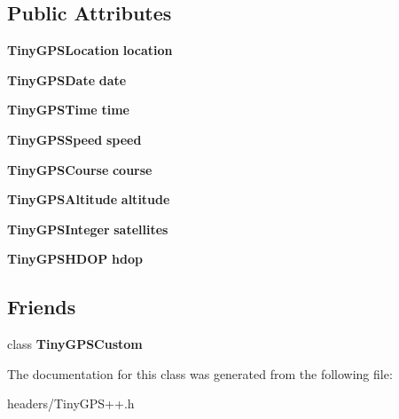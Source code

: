 \subsection*{Public Attributes}
\begin{DoxyCompactItemize}
\item 
{\bf Tiny\+G\+P\+S\+Location} {\bfseries location}\label{class_tiny_g_p_s_plus_a886255f412f8e01f84e5104d36315fb3}

\item 
{\bf Tiny\+G\+P\+S\+Date} {\bfseries date}\label{class_tiny_g_p_s_plus_a83a70812b432d7f51c7c735bfe7be0f0}

\item 
{\bf Tiny\+G\+P\+S\+Time} {\bfseries time}\label{class_tiny_g_p_s_plus_a377c975527fa24b45fb86356505eb134}

\item 
{\bf Tiny\+G\+P\+S\+Speed} {\bfseries speed}\label{class_tiny_g_p_s_plus_aa085c3e72a399a829dd92af52b373404}

\item 
{\bf Tiny\+G\+P\+S\+Course} {\bfseries course}\label{class_tiny_g_p_s_plus_ad7800d3decbe58e355f5229bba231868}

\item 
{\bf Tiny\+G\+P\+S\+Altitude} {\bfseries altitude}\label{class_tiny_g_p_s_plus_a0b3451a4ee75e5880ffd88c3038eacf8}

\item 
{\bf Tiny\+G\+P\+S\+Integer} {\bfseries satellites}\label{class_tiny_g_p_s_plus_a5fb47066d1d03f4bb5853529053aab48}

\item 
{\bf Tiny\+G\+P\+S\+H\+D\+OP} {\bfseries hdop}\label{class_tiny_g_p_s_plus_a0bb6a7eb2d0261095911d71c8c067546}

\end{DoxyCompactItemize}
\subsection*{Friends}
\begin{DoxyCompactItemize}
\item 
class {\bfseries Tiny\+G\+P\+S\+Custom}\label{class_tiny_g_p_s_plus_aaad5bf5a2728a81e624ad2304f817772}

\end{DoxyCompactItemize}


The documentation for this class was generated from the following file\+:\begin{DoxyCompactItemize}
\item 
headers/Tiny\+G\+P\+S++.\+h\end{DoxyCompactItemize}
